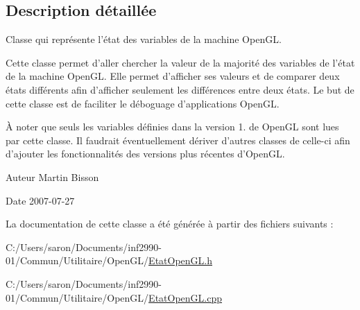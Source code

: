 \subsection{Description détaillée}
Classe qui représente l'état des variables de la machine Open\-G\-L. 

Cette classe permet d'aller chercher la valeur de la majorité des variables de l'état de la machine Open\-G\-L. Elle permet d'afficher ses valeurs et de comparer deux états différents afin d'afficher seulement les différences entre deux états. Le but de cette classe est de faciliter le déboguage d'applications Open\-G\-L.

À noter que seuls les variables définies dans la version 1. de Open\-G\-L sont lues par cette classe. Il faudrait éventuellement dériver d'autres classes de celle-\/ci afin d'ajouter les fonctionnalités des versions plus récentes d'Open\-G\-L.

\begin{DoxyAuthor}{Auteur}
Martin Bisson 
\end{DoxyAuthor}
\begin{DoxyDate}{Date}
2007-\/07-\/27 
\end{DoxyDate}


La documentation de cette classe a été générée à partir des fichiers suivants \-:\begin{DoxyCompactItemize}
\item 
C\-:/\-Users/saron/\-Documents/inf2990-\/01/\-Commun/\-Utilitaire/\-Open\-G\-L/\hyperlink{_etat_open_g_l_8h}{Etat\-Open\-G\-L.\-h}\item 
C\-:/\-Users/saron/\-Documents/inf2990-\/01/\-Commun/\-Utilitaire/\-Open\-G\-L/\hyperlink{_etat_open_g_l_8cpp}{Etat\-Open\-G\-L.\-cpp}\end{DoxyCompactItemize}

